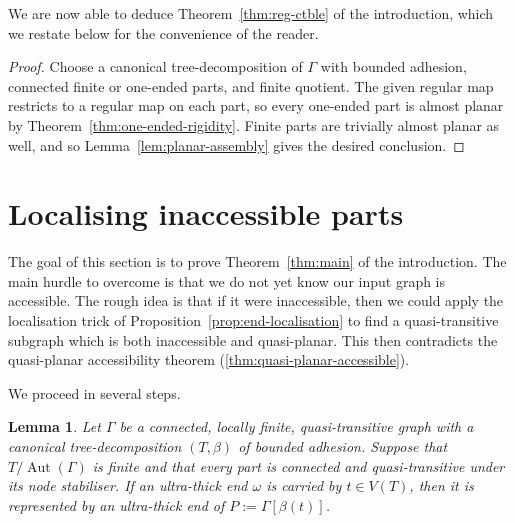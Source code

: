 \documentclass[10pt,a4paper]{amsart}
\newtheorem{lemma}[theorem]{Lemma}
\theoremstyle{definition}
\begin{document}
We are now able to deduce Theorem~\ref{thm:reg-ctble} of the introduction, which we restate below for the convenience of the reader. 

\regctble*

\begin{proof}
Choose a canonical tree-decomposition of $\Gamma$ with bounded adhesion, connected finite or one-ended parts,  and finite quotient.
The given regular map restricts to a regular map on each part, so every one-ended part is almost planar by Theorem~\ref{thm:one-ended-rigidity}.
Finite parts are trivially almost planar as well, and so Lemma~\ref{lem:planar-assembly} gives the desired conclusion.
\end{proof}

\section{Localising inaccessible parts}\label{sec:accessibility}

The goal of this section is to prove Theorem~\ref{thm:main} of the introduction. The main hurdle to overcome is that we do not yet know our input graph is accessible. The rough idea is that if it were inaccessible, then we could apply the localisation trick of Proposition~\ref{prop:end-localisation} to find a quasi-transitive subgraph which is both inaccessible and quasi-planar. This then contradicts the quasi-planar accessibility theorem (\ref{thm:quasi-planar-accessible}). 

We proceed in several steps. 


\begin{lemma}\label{lem:ultra-thick-in-part}
Let $\Gamma$ be a connected, locally finite, quasi-transitive graph with a canonical tree-decomposition $(T,\beta)$ of bounded adhesion.
Suppose that $T/\operatorname{Aut}(\Gamma)$ is finite and that every part is connected and quasi-transitive under its node stabiliser.
If an ultra-thick end $\omega$ is carried by $t\in V(T)$, then it is represented by an ultra-thick end of $P:=\Gamma[\beta(t)]$.
\end{lemma}
\end{document}
